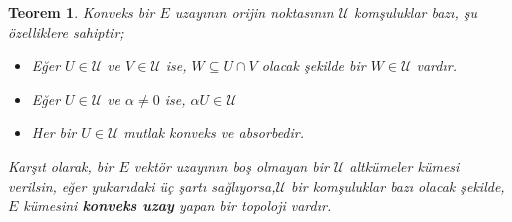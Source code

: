 \documentclass[11pt]{article}
\theoremstyle{plain}
\newtheorem{theorem}{Teorem}
\theoremstyle{definition}
\theoremstyle{remark}
\numberwithin{equation}{section}
\renewcommand{\%}{{\small \%}}
\begin{document}
\begin{theorem}
Konveks bir $E$ uzayının orijin noktasının $\mathscr{U}$ komşuluklar bazı, şu özelliklere sahiptir;

\begin{itemize}
\item[(C1)] Eğer $U\in\mathscr{U}$ ve $V\in\mathscr{U}$ ise, $W\subseteq U\cap V$ olacak şekilde bir $W\in\mathscr{U}$ vardır.
\item[(C2)] Eğer $U\in\mathscr{U}$ ve $\alpha\neq 0$ ise, $\alpha U\in\mathscr{U}$
\item[(C3)] Her bir $U\in\mathscr{U}$ mutlak konveks ve absorbedir.
\end{itemize}
Karşıt olarak, bir $E$ vektör uzayının boş olmayan bir $\mathscr{U}$ altkümeler kümesi verilsin, eğer yukarıdaki üç şartı sağlıyorsa,$\mathscr{U}$ bir komşuluklar bazı olacak şekilde, $E$ kümesini \textbf{konveks uzay} yapan bir topoloji vardır.
\end{theorem}
\end{document}
